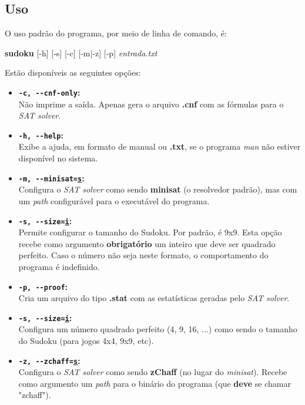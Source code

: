 \documentclass[a4paper]{article}
\begin{document}
  \subsection{Uso}
  \label{subsec:uso}
    
    O uso padrão do programa, por meio de linha de comando, é: 
    \begin{center}
    \textbf{sudoku} [-h] [-s] [-c] [-m|-z] [-p] \emph{entrada.txt}
    \end{center}
    
    Estão disponíveis as seguintes opções:
    \begin{itemize}
      
      \item \textbf{\texttt{-c, -{}-cnf-only}:} \\
        Não imprime a saída. Apenas gera o arquivo \textbf{.cnf} com as
        fórmulas para o \emph{SAT solver}.
        
      \item \textbf{\texttt{-h, -{}-help}:} \\
        Exibe a ajuda, em formato de manual ou \textbf{.txt}, se o 
        programa \emph{man} não estiver disponível no sistema.
        
      \item \textbf{\texttt{-m, -{}-minisat=\underline{s}}:} \\
        Configura o \emph{SAT solver} como sendo \textbf{minisat} (o
        resolvedor padrão), mas com um \emph{path} configurável para o
        executável do programa.
        
      \item \textbf{\texttt{-s, -{}-size=\underline{i}}:} \\
        Permite configurar o tamanho do Sudoku. Por padrão, é 9x9. 
        Esta opção recebe como argumento \textbf{obrigatório} um 
        inteiro que deve ser quadrado perfeito. Caso o número não
        seja neste formato, o comportamento do programa é indefinido.
        
      \item \textbf{\texttt{-p, -{}-proof}:} \\
        Cria um arquivo do tipo \textbf{.stat} com as estatísticas 
        geradas pelo \emph{SAT solver}.
        
      \item \textbf{\texttt{-s, -{}-size=\underline{i}}:} \\
        Configura um número quadrado perfeito (4, 9, 16, ...) como 
        sendo o tamanho do Sudoku (para jogos 4x4, 9x9, etc).
        
      \item \textbf{\texttt{-z, -{}-zchaff=\underline{s}}:} \\
        Configura o \emph{SAT solver} como sendo \textbf{zChaff} 
        (no lugar do \emph{minisat}). Recebe como argumento um 
        \emph{path} para o binário do programa (que \textbf{deve}
        se chamar "zchaff").
        
    \end{itemize}
    
\end{document}
